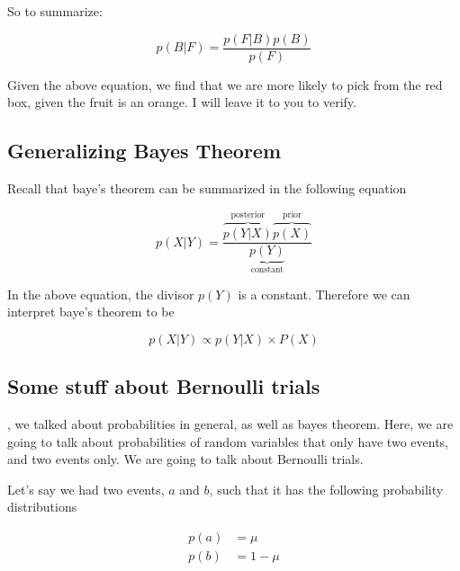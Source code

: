 \documentclass{tufte-handout}
\begin{document}
So to summarize:

\begin{equation}
  p(B|F) = \frac{p(F|B)p(B)}{p(F)}
\end{equation}

Given the above equation, we find that we are more likely to pick from the red box, given the fruit is an orange. I will leave it to you to verify.

\subsection{Generalizing Bayes Theorem}

Recall that baye's theorem can be summarized in the following equation

\begin{equation}
  p(X|Y) = \frac{\overbrace{p(Y|X)}^{\text{posterior}}\overbrace{p(X)}^{\text{prior}}}{\underbrace{p(Y)}_{\text{constant}}}
\end{equation}

In the above equation, the divisor $p(Y)$ is a constant. Therefore we can interpret baye's theorem to be

\begin{equation}
  p(X|Y) \propto p(Y|X) \times P(X)
\end{equation}

\subsection{Some stuff about Bernoulli trials}


, we talked about probabilities in general, as well as bayes theorem. Here, we are going to talk about probabilities of random variables that only have two events, and two events only. We are going to talk about Bernoulli trials.

Let's say we had two events, $a$ and $b$, such that it has the following probability distributions

\begin{equation}
  \begin{aligned}
    p(a) &= \mu \\
    p(b) &= 1 - \mu
  \end{aligned}
\end{equation}
\end{document}
